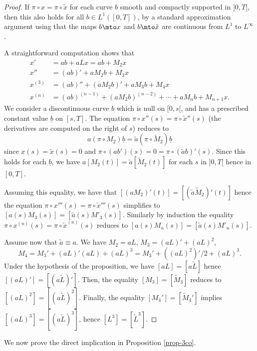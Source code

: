 \begin{proof}
If $\pi\circ x =\pi \circ \tilde x$ for each curve $b$ smooth and compactly supported in $]0,T[$, then this also holds for
all $b\in L^1([0,T])$, by a standard approximation argument using that the maps $b\mto x$ and $b\mto \tilde x$ are continuous from $L^1$ to $L^{\infty}$.

A straightforward computation shows that
\begin{align*}
x'&=ab+ aLx=ab+M_2x\\
x''&=(ab)'+aM_2b+M_3x\\
x^{(3)}&=(ab)''+(aM_2b)'+aM_3b+M_4 x\\
x^{(n)}&=(ab)^{(n-1)}+(aM_2b)^{(n-2)}+ \cdots + a M_n b+ M_{n+1}x.
\end{align*}
We consider a discontinuous curve $b$ which is null on $[0,s[$, and has a prescribed constant value
$\underline b
$
on $[s, T]$.
The equation $\pi \circ x''(s)=\pi \circ \tilde x''(s)$ (the derivatives are computed on the right of $s$) reduces to
\[
a(\pi \circ M_2 )\underline b=\tilde a(\pi \circ \tilde M_2 )\underline b
\]
since $x(s)=\tilde x(s)=0$ and $\pi \circ (ab')(s)=0=\pi \circ (\tilde a b)'(s)$. Since this holds for each
$\underline b$, we have $a[M_2(t)]=\tilde a[\tilde M_2(t)]$ for each $s$ in $]0,T[$ hence in $[0,T]$.

Assuming this equality, we have that $[(aM_2)'(t)]= [(\tilde a\tilde M_2)'(t)]$ hence the equation
$\pi \circ x'''(s)=\pi \circ \tilde x'''(s)$
simplifies to $[a(s)M_3(s)]=[\tilde a (s)M'_3(s)]$. Similarly by induction the equality
$\pi \circ x^{(n)}(s)=\pi \circ \tilde x^{(n)}(s)$ reduces to
$[a(s)M_n(s)]=[\tilde a (s)M'_n(s)]$.

Assume now that $\tilde a \equiv a$. We have $M_2=aL$, $M_3=(aL)'+(aL)^2$,
\[
M_4=M_3'+(aL)'(aL)+(aL)^3= M_3'+((aL)^2)'/2+(aL)^3.
\]
Under the hypothesis of the proposition, we have $[aL]=[ a\tilde L]$ hence
$[(aL)']=[( a\tilde L)']$.
Then, the equality
$[M_3]=[\tilde M_3]$ reduces to $[(aL)^2]=[( a \tilde L)^2]$.
Finally, the equality
$[M_4']=[\tilde M_4']$ implies $[(aL)^3]=[(a\tilde L)^3]$, hence $[L^3]=[\tilde L^3]$.
\end{proof}

We now prove the direct implication in Proposition \ref{prop-3co}.

